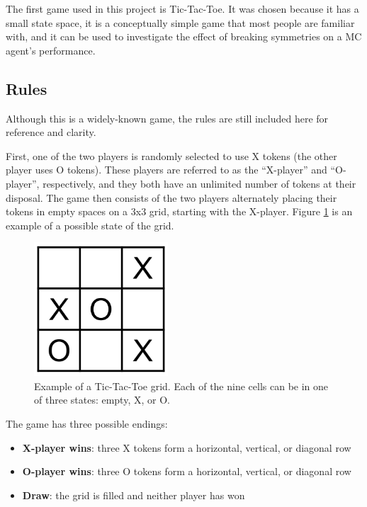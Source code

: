 \documentclass[11pt,a4paper]{report}
\begin{document}
The first game used in this project is Tic-Tac-Toe. It was chosen because it has a small state space, it is a conceptually simple game that most people are familiar with, and it can be used to investigate the effect of breaking symmetries on a MC agent's performance.


\subsection{Rules}

Although this is a widely-known game, the rules \cite{tic-tac-toe-rules} are still included here for reference and clarity.

First, one of the two players is randomly selected to use X tokens (the other player uses O tokens). These players are referred to as the ``X-player'' and ``O-player'', respectively, and they both have an unlimited number of tokens at their disposal. The game then consists of the two players alternately placing their tokens in empty spaces on a 3x3 grid, starting with the X-player. Figure \ref{tic-tac-toe-grid-example} is an example of a possible state of the grid.

\begin{figure}[htbp]
	\begin{center}
		\includegraphics[width=50mm]{tictactoe_grid_example.png}
		\caption{Example of a Tic-Tac-Toe grid. Each of the nine cells can be in one of three states: empty, X, or O.}
		\label{tic-tac-toe-grid-example}
	\end{center}
\end{figure}

The game has three possible endings:

\begin{itemize}
	\item \textbf{X-player wins}: three X tokens form a horizontal, vertical, or diagonal row
	\item \textbf{O-player wins}: three O tokens form a horizontal, vertical, or diagonal row
	\item \textbf{Draw}: the grid is filled and neither player has won
\end{itemize}
\end{document}
